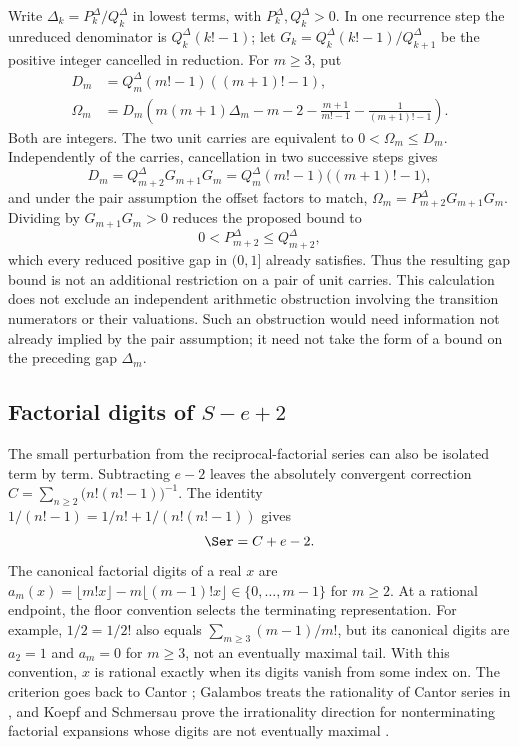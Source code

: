Write $\Delta_k=P^\Delta_k/Q^\Delta_k$ in lowest terms, with $P^\Delta_k,Q^\Delta_k>0$.
In one recurrence step the unreduced denominator is $Q^\Delta_k(k!-1)$;
let $G_k=Q^\Delta_k(k!-1)/Q^\Delta_{k+1}$ be the positive integer cancelled in reduction.
For $m\ge3$, put
\[
 \begin{aligned}
 D_m&=Q^\Delta_m(m!-1)((m+1)!-1),\\
 \Omega_m&=D_m\left(m(m+1)\Delta_m-m-2
       -\frac{m+1}{m!-1}-\frac1{(m+1)!-1}\right).
 \end{aligned}
\]
Both are integers. The two unit carries are equivalent to
$0<\Omega_m\le D_m$. Independently of the carries, cancellation in two
successive steps gives
\[
 D_m=Q^\Delta_{m+2}G_{m+1}G_m=Q^\Delta_m(m!-1)\bigl((m+1)!-1\bigr),
\]
and under the pair assumption the offset factors to match,
$\Omega_m=P^\Delta_{m+2}G_{m+1}G_m$.  Dividing by $G_{m+1}G_m>0$ reduces the proposed bound to
\[
 0<P^\Delta_{m+2}\le Q^\Delta_{m+2},
\]
which every reduced positive gap in $(0,1]$ already satisfies.  Thus the resulting gap bound is not an additional restriction on a
pair of unit carries. This calculation does not exclude an independent
arithmetic obstruction involving the transition numerators or their
valuations. Such an obstruction would need information not already
implied by the pair assumption; it need not take the form of a bound on
the preceding gap $\Delta_m$.

\subsection{Factorial digits of \texorpdfstring{$S-e+2$}{S-e+2}}\label{long68:sec:companion-digits}

The small perturbation from the reciprocal-factorial series can also
be isolated term by term. Subtracting $e-2$ leaves the absolutely
convergent correction $C=\sum_{n\ge2}\bigl(n!(n!-1)\bigr)^{-1}$.
The identity $1/(n!-1)=1/n!+1/(n!(n!-1))$ gives
\begin{equation}\label{long68:eq:companion-decomposition}
 \Ser=C+e-2 .
\end{equation}
The canonical factorial digits of a real $x$ are
$a_m(x)=\lfloor m!x\rfloor-m\lfloor(m-1)!x\rfloor\in\{0,\ldots,m-1\}$
for $m\ge2$. At a rational endpoint, the floor convention selects the
terminating representation. For example, $1/2=1/2!$ also equals
$\sum_{m\ge3}(m-1)/m!$, but its canonical digits are $a_2=1$ and
$a_m=0$ for $m\ge3$, not an eventually maximal tail. With this convention,
$x$ is rational exactly when its digits vanish from some index on. The criterion
goes back to Cantor \cite{cantor1869}; Galambos treats the rationality of
Cantor series in \cite[Ch.~II, \S2.1, pp.~21--22]{galambos1976}, and Koepf
and Schmersau prove the irrationality direction for nonterminating factorial
expansions whose digits are not eventually maximal
\cite[Example~3.2, p.~121]{koepf-schmersau}.

